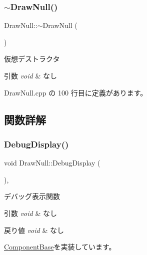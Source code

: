 \subsubsection{\texorpdfstring{$\sim$\+Draw\+Null()}{~DrawNull()}}
{\footnotesize\ttfamily Draw\+Null\+::$\sim$\+Draw\+Null (\begin{DoxyParamCaption}{ }\end{DoxyParamCaption})\hspace{0.3cm}{\ttfamily [virtual]}}



仮想デストラクタ 


\begin{DoxyParams}{引数}
{\em void} & なし \\
\hline
\end{DoxyParams}


 Draw\+Null.\+cpp の 100 行目に定義があります。



\subsection{関数詳解}
\mbox{\label{class_draw_null_aed3bbedfe8db8daf7cafa143750f2114}} 
\subsubsection{\texorpdfstring{Debug\+Display()}{DebugDisplay()}}
{\footnotesize\ttfamily void Draw\+Null\+::\+Debug\+Display (\begin{DoxyParamCaption}{ }\end{DoxyParamCaption})\hspace{0.3cm}{\ttfamily [override]}, {\ttfamily [virtual]}}



デバッグ表示関数 


\begin{DoxyParams}{引数}
{\em void} & なし \\
\hline
\end{DoxyParams}

\begin{DoxyRetVals}{戻り値}
{\em void} & なし \\
\hline
\end{DoxyRetVals}


\mbox{\hyperlink{class_component_base_a36ae7d27ad9d756fa245bad443020407}{Component\+Base}}を実装しています。



